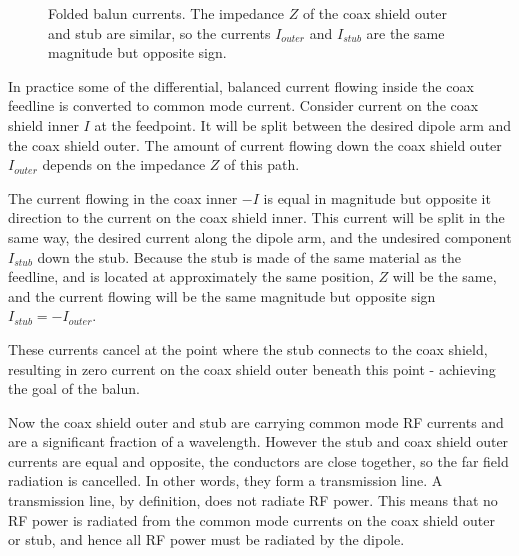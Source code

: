 \documentclass{article}
\begin{document}
\begin{figure}[h]
\caption{Folded balun currents.  The impedance $Z$ of the coax shield outer and stub are similar, so the currents $I_{outer}$ and $I_{stub}$ are the same magnitude but opposite sign.}
\label{fig:currents}
\vspace{5mm}
\centering
{}
\end{figure}

In practice some of the differential, balanced current flowing inside the coax feedline is converted to common mode current.  Consider current on the coax shield inner $I$ at the feedpoint.  It will be split between the desired dipole arm and the coax shield outer. The amount of current flowing down the coax shield outer $I_{outer}$ depends on the impedance $Z$ of this path.

The current flowing in the coax inner $-I$ is equal in magnitude but opposite it direction to the current on the coax shield inner.  This current will be split in the same way, the desired current along the dipole arm, and the undesired component $I_{stub}$ down the stub.  Because the stub is made of the same material as the feedline, and is located at approximately the same position, $Z$ will be the same, and the current flowing will be the same magnitude but opposite sign $I_{stub}=-I_{outer}$.  

These currents cancel at the point where the stub connects to the coax shield, resulting in zero current on the coax shield outer beneath this point - achieving the goal of the balun.

Now the coax shield outer and stub are carrying common mode RF currents and are a significant fraction of a wavelength. However the stub and coax shield outer currents are equal and opposite, the conductors are close together, so the far field radiation is cancelled.  In other words, they form a transmission line.  A transmission line, by definition, does not radiate RF power. This means that no RF power is radiated from the common mode currents on the coax shield outer or stub, and hence all RF power must be radiated by the dipole.
\end{document}
